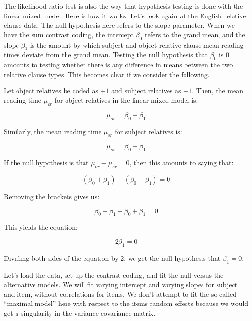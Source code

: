 \documentclass[12pt,]{krantz}
\begin{document}
The likelihood ratio test is also the way that hypothesis testing is done with the linear mixed model. Here is how it works. Let's look again at the \citet{grodner} English relative clause data. The null hypothesis here refers to the slope parameter. When we have the sum contrast coding, the intercept \(\beta_0\) refers to the grand mean, and the slope \(\beta_1\) is the amount by which subject and object relative clause mean reading times deviate from the grand mean. Testing the null hypothesis that \(\beta_0\) is 0 amounts to testing whether there is any difference in means between the two relative clause types. This becomes clear if we consider the following.

Let object relatives be coded as \(+1\) and subject relatives as \(-1\). Then, the mean reading time \(\mu_{or}\) for object relatives in the linear mixed model is:

\begin{equation}
\mu_{or}=\beta_0 + \beta_1
\end{equation}

Similarly, the mean reading time \(\mu_{sr}\) for subject relatives is:

\begin{equation}
\mu_{sr}=\beta_0 - \beta_1
\end{equation}

If the null hypothesis is that \(\mu_{or}-\mu_{sr}=0\), then this amounts to saying that:

\begin{equation}
(\beta_0 + \beta_1)-(\beta_0 - \beta_1)=0
\end{equation}

Removing the brackets gives us:

\begin{equation}
\beta_0 + \beta_1-\beta_0 + \beta_1 = 0
\end{equation}

This yields the equation:

\begin{equation}
2\beta_1= 0
\end{equation}

Dividing both sides of the equation by 2, we get the null hypothesis that \(\beta_1=0\).

Let's load the data, set up the contrast coding, and fit the null versus the alternative models. We will fit varying intercept and varying slopes for subject and item, without correlations for items. We don't attempt to fit the so-called ``maximal model'' here with respect to the items random effects because we would get a singularity in the variance covariance matrix.
\end{document}
